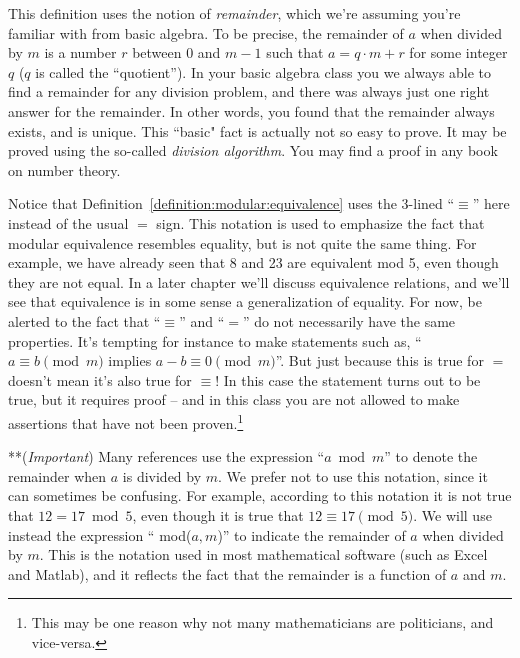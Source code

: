 \begin{rem}
This definition uses the notion of \emph{remainder}, which we're assuming you're familiar with from  basic algebra. To be precise, the remainder of $a$ when divided by $m$ is a number $r$ between $0$ and $m-1$ such that  $a = q \cdot m + r$ for some integer $q$ ($q$ is called the ``quotient'').  In your basic algebra class you we always able to find a remainder for any division problem, and there was always just one right answer for the remainder. In other words, you found that the remainder always exists, and is unique. This ``basic" fact is actually not so easy to prove. It may be proved using the so-called \emph{division algorithm}. You may find a proof in any book on number theory.
\end{rem}

\begin{rem}
Notice that Definition~\ref{definition:modular:equivalence} uses the 3-lined ``$\equiv$'' here instead of the usual $=$ sign. This notation is used  to emphasize the fact that modular equivalence resembles equality, but is not quite the same thing.  For example, we have already seen that 8 and 23 are equivalent mod 5, even though they are not equal.  In a later chapter we'll discuss equivalence relations, and we'll see that equivalence is in some sense a generalization of equality. For now,  be alerted to the fact that ``$\equiv$'' and ``$=$'' do not necessarily have the same properties. It's tempting for instance to make statements such as, ``$a \equiv b \pmod{m}$ implies $a-b \equiv 0 \pmod{m}$''. But just because this is true for $=$ doesn't mean it's also true for $\equiv$!  In this case the statement turns out to be true, but it requires proof -- and in this class you are not allowed to make assertions that have not been proven.\footnote{This may be one reason why not many mathematicians are politicians, and vice-versa.}  
\end{rem}

\begin{rem}
**(\emph{Important}) Many references use the expression ``$a \bmod m$'' to denote the remainder when $a$ is divided by $m$.  We prefer not to use this notation, since it can sometimes be confusing.  For example, according to this notation it is not true that $12 = 17 \bmod 5$, even though it is true that $12 \equiv 17 \pmod{5}$.   We will use instead the expression `` mod($a,m$)'' to indicate the remainder of $a$ when divided by $m$.  This is the notation used in most mathematical software (such as Excel and Matlab), and it reflects the fact that the remainder is a function of $a$ and $m$. 
\end{rem}

